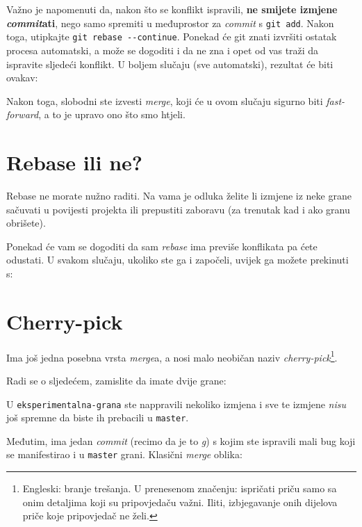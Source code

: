 

Važno je napomenuti da, nakon što se konflikt ispravili, \textbf{ne smijete izmjene \emph{commit}ati}, nego samo spremiti u međuprostor za \emph{commit} s \verb+git add+.
Nakon toga, utipkajte \verb+git rebase --continue+.
Ponekad će git znati izvršiti ostatak procesa automatski, a može se dogoditi i da ne zna i opet od vas traži da ispravite sljedeći konflikt.
U boljem slučaju (sve automatski), rezultat će biti ovakav:



Nakon toga, slobodni ste izvesti \emph{merge}, koji će u ovom slučaju sigurno biti \emph{fast-forward}, a to je upravo ono što smo htjeli.

\section*{Rebase ili ne?}

Rebase ne morate nužno raditi.
Na vama je odluka želite li izmjene iz neke grane sačuvati u povijesti projekta ili prepustiti zaboravu (za trenutak kad i ako granu obrišete).

Ponekad će vam se dogoditi da sam \emph{rebase} ima previše konflikata pa ćete odustati.
U svakom slučaju, ukoliko ste ga i započeli, uvijek ga možete prekinuti s:


\section*{Cherry-pick}

Ima još jedna posebna vrsta \emph{merge}a, a nosi malo neobičan naziv \emph{cherry-pick}\footnote{Engleski: branje trešanja. U prenesenom značenju: ispričati priču samo sa onim detaljima koji su pripovjedaču važni. Iliti, izbjegavanje onih dijelova priče koje pripovjedač ne želi.}.

Radi se o sljedećem, zamislite da imate dvije grane:



U \verb+eksperimentalna-grana+ ste nappravili nekoliko izmjena i sve te izmjene \emph{nisu} još spremne da biste ih prebacili u \verb+master+.

Međutim, ima jedan \emph{commit} (recimo da je to \emph g) s kojim ste ispravili mali bug koji se manifestirao i u \verb+master+ grani.
Klasični \emph{merge} oblika:


